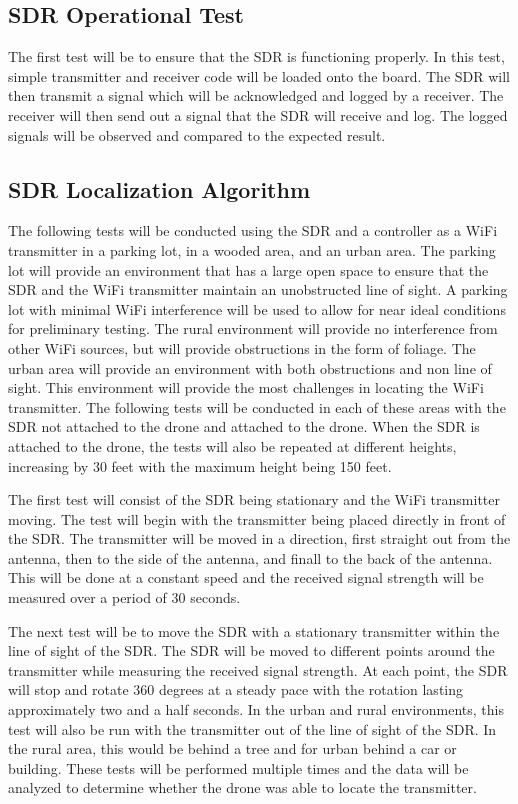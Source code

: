\subsection{SDR Operational Test}
The first test will be to ensure that the SDR is functioning properly. In this test, simple transmitter and receiver code will be loaded onto the board. The SDR will then transmit a signal which will be acknowledged and logged by a receiver. The receiver will then send out a signal that the SDR will receive and log. The logged signals will be observed and compared to the expected result. \par 

\subsection{SDR Localization Algorithm}
The following tests will be conducted using the SDR and a controller as a WiFi transmitter in a parking lot, in a wooded area, and an urban area. The parking lot will provide an environment that has a large open space to ensure that the SDR and the WiFi transmitter maintain an unobstructed line of sight. A parking lot with minimal WiFi interference will be used to allow for near ideal conditions for preliminary testing. The rural environment will provide no interference from other WiFi sources, but will provide obstructions in the form of foliage. The urban area will provide an environment with both obstructions and non line of sight. This environment will provide the most challenges in locating the WiFi transmitter. The following tests will be conducted in each of these areas with the SDR not attached to the drone and attached to the drone. When the SDR is attached to the drone, the tests will also be repeated at different heights, increasing by 30 feet with the maximum height being 150 feet.\par 
The first test will consist of the SDR being stationary and the WiFi transmitter moving. The test will begin with the transmitter being placed directly in front of the SDR. The transmitter will be moved in a direction, first straight out from the antenna, then to the side of the antenna, and finall to the back of the antenna. This will be done at a constant speed and the received signal strength will be measured over a period of 30 seconds.\par 
The next test will be to move the SDR with a stationary transmitter within the line of sight of the SDR. The SDR will be moved to different points around the transmitter while measuring the received signal strength. At each point, the SDR will stop and rotate 360 degrees at a steady pace with the rotation lasting approximately two and a half seconds. In the urban and rural environments, this test will also be run with the transmitter out of the line of sight of the SDR. In the rural area, this would be behind a tree and for urban behind a car or building. These tests will be performed multiple times and the data will be analyzed to determine whether the drone was able to locate the transmitter.\par 

